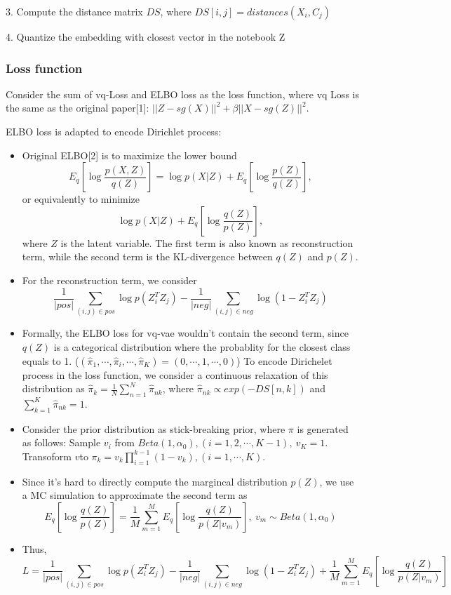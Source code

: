 \documentclass[12pt]{amsart}
\begin{document}
3. Compute the distance matrix $DS$, where $DS[i,j] = distances(X_i, C_j)$  

4. Quantize the embedding with closest vector in the notebook Z 

\subsubsection{Loss function}
\hfill

Consider the sum of vq-Loss and ELBO loss as the loss function, where vq Loss is the same as the original paper[1]: $||Z-sg(X)||^2 + \beta ||X-sg(Z)||^2$.

ELBO loss is adapted to encode Dirichlet process: 
\begin{itemize}
    \item
    Original ELBO[2] is to maximize the lower bound 
    \[E_q[ \log \frac{ p(X,Z) }{ q(Z) } ] = \log p(X|Z) + E_q[ \log \frac{ p(Z) }{ q(Z) }],\]
    or equivalently to minimize
    \[ \log p(X|Z) + E_q[\log \frac{ q(Z) }{ p(Z) }],\]
     where $Z$ is the latent variable. The first term is also known as reconstruction term, while the second term is the KL-divergence between $q(Z)$ and $p(Z)$.
    \item For the reconstruction term, we consider 
    \[ \frac{1}{|pos|} \sum_{(i,j) \in pos} \log p(Z_{i}^T Z_{j})- \frac{1}{|neg|}\sum_{(i,j) \in neg} \log(1-Z_i^T Z_j) \]

    \item 
    Formally, the ELBO loss for vq-vae wouldn't contain the second term, 
    since $q(Z)$ is a categorical distribution where the probablity for 
    the closest class equals to 1. ($(\hat{\pi}_1, \cdots, \hat{\pi}_i, \cdots, \hat{\pi}_K) = (0, \cdots, 1, \cdots, 0)$)
    To encode Dirichelet process in the loss function, we consider a continuous relaxation of this distribution as 
    $\hat{\pi}_k = \frac{1}{N}\sum_{n=1}^{N} \hat{\pi}_{nk}$, where $\hat{\pi}_{nk} \propto exp(-DS[n,k])$ and $\sum_{k=1}^{K}{\hat{\pi}_{nk}}=1$.
    \item 
    Consider the prior distribution as stick-breaking prior, where $\pi$ is generated as follows:
    \subitem Sample $v_i$ from $Beta(1, \alpha_0), (i=1, 2, \cdots, K-1), \ v_K = 1$.
    \subitem Transoform $v $to $\pi_k = v_k \prod_{i=1}^{k-1}(1-v_{k}), (i=1, \cdots, K).$
    \item Since it's hard to directly compute the margincal distribution $p(Z)$,
    we use a MC simulation to approximate the second term as 
    \[ E_q[\log \frac{q(Z)}{p(Z)}] = \frac{1}{M} \sum_{m=1}^M E_q[\log \frac{q(Z)}{p(Z|v_m)} ], \ v_m \sim Beta(1,\alpha_0) \]
    \item 
    Thus,
    \[  L = \frac{1}{|pos|} \sum_{(i,j) \in pos} \log p(Z_{i}^T Z_{j})- \frac{1}{|neg|}\sum_{(i,j) \in neg} \log(1-Z_i^T Z_j) + \frac{1}{M} \sum_{m=1}^M E_q[\log \frac{q(Z)}{p(Z|v_m)}] \]
\end{itemize}
\end{document}
